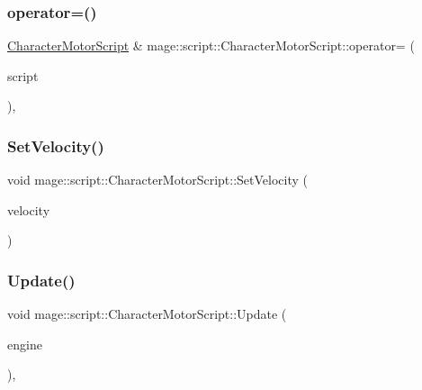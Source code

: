 \subsubsection{\texorpdfstring{operator=()}{operator=()}\hspace{0.1cm}{\footnotesize\ttfamily [2/2]}}
{\footnotesize\ttfamily \mbox{\hyperlink{classmage_1_1script_1_1_character_motor_script}{Character\+Motor\+Script}} \& mage\+::script\+::\+Character\+Motor\+Script\+::operator= (\begin{DoxyParamCaption}\item[{\mbox{\hyperlink{classmage_1_1script_1_1_character_motor_script}{Character\+Motor\+Script}} \&\&}]{script }\end{DoxyParamCaption})\hspace{0.3cm}{\ttfamily [default]}, {\ttfamily [noexcept]}}

\mbox{\label{classmage_1_1script_1_1_character_motor_script_a51c9b8317670fc0ae554bfb0cac11aee}} 
\subsubsection{\texorpdfstring{Set\+Velocity()}{SetVelocity()}}
{\footnotesize\ttfamily void mage\+::script\+::\+Character\+Motor\+Script\+::\+Set\+Velocity (\begin{DoxyParamCaption}\item[{\mbox{\hyperlink{namespacemage_aa97e833b45f06d60a0a9c4fc22ae02c0}{F32}}}]{velocity }\end{DoxyParamCaption})\hspace{0.3cm}{\ttfamily [noexcept]}}

\mbox{\label{classmage_1_1script_1_1_character_motor_script_ae738c9550e17be133291ccd2a6681368}} 
\subsubsection{\texorpdfstring{Update()}{Update()}}
{\footnotesize\ttfamily void mage\+::script\+::\+Character\+Motor\+Script\+::\+Update (\begin{DoxyParamCaption}\item[{\mbox{[}\mbox{[}maybe\+\_\+unused\mbox{]} \mbox{]} \mbox{\hyperlink{classmage_1_1_engine}{Engine}} \&}]{engine }\end{DoxyParamCaption})\hspace{0.3cm}{\ttfamily [override]}, {\ttfamily [virtual]}}

